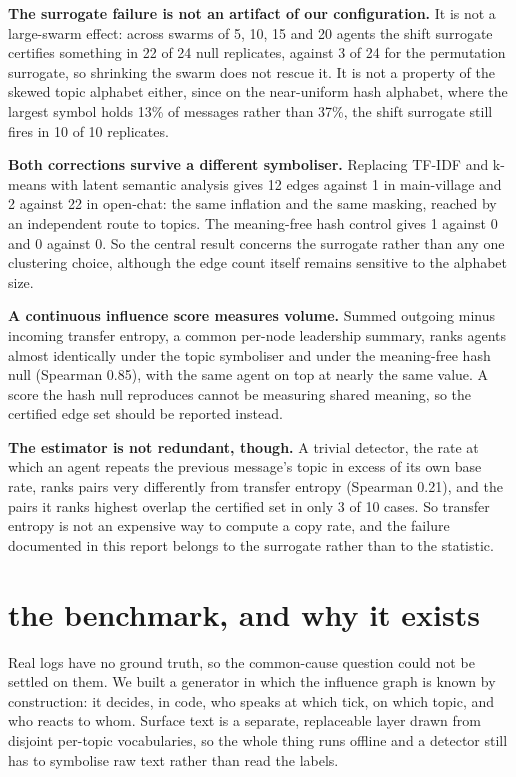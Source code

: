 \documentclass[11pt]{article}
\begin{document}
\textbf{The surrogate failure is not an artifact of our configuration.} It is not a large-swarm effect: across swarms of 5, 10, 15 and 20 agents the shift surrogate certifies something in 22 of 24 null replicates, against 3 of 24 for the permutation surrogate, so shrinking the swarm does not rescue it. It is not a property of the skewed topic alphabet either, since on the near-uniform hash alphabet, where the largest symbol holds 13\% of messages rather than 37\%, the shift surrogate still fires in 10 of 10 replicates.

\textbf{Both corrections survive a different symboliser.} Replacing TF-IDF and k-means with latent semantic analysis gives 12 edges against 1 in main-village and 2 against 22 in open-chat: the same inflation and the same masking, reached by an independent route to topics. The meaning-free hash control gives 1 against 0 and 0 against 0. So the central result concerns the surrogate rather than any one clustering choice, although the edge count itself remains sensitive to the alphabet size.

\textbf{A continuous influence score measures volume.} Summed outgoing minus incoming transfer entropy, a common per-node leadership summary, ranks agents almost identically under the topic symboliser and under the meaning-free hash null (Spearman 0.85), with the same agent on top at nearly the same value. A score the hash null reproduces cannot be measuring shared meaning, so the certified edge set should be reported instead.

\textbf{The estimator is not redundant, though.} A trivial detector, the rate at which an agent repeats the previous message's topic in excess of its own base rate, ranks pairs very differently from transfer entropy (Spearman 0.21), and the pairs it ranks highest overlap the certified set in only 3 of 10 cases. So transfer entropy is not an expensive way to compute a copy rate, and the failure documented in this report belongs to the surrogate rather than to the statistic.

\section{the benchmark, and why it exists}

Real logs have no ground truth, so the common-cause question could not be settled on them. We built a generator in which the influence graph is known by construction: it decides, in code, who speaks at which tick, on which topic, and who reacts to whom. Surface text is a separate, replaceable layer drawn from disjoint per-topic vocabularies, so the whole thing runs offline and a detector still has to symbolise raw text rather than read the labels.
\end{document}
